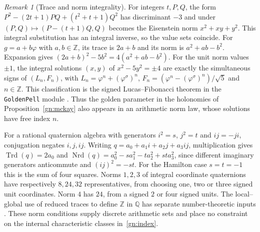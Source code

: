 \documentclass[aps,pra,onecolumn,superscriptaddress,nofootinbib,10pt]{revtex4-2}
\theoremstyle{definition}
\theoremstyle{remark}
\newtheorem{remark}[theorem]{Remark}
\begin{document}
\begin{remark}[Trace and norm integrality]\label{gn:leanarith}
For integers $t,P,Q$, the form
$P^2-(2t+1)PQ+(t^2+t+1)Q^2$ has discriminant $-3$ and
under $(P,Q)\mapsto(P-(t+1)Q,Q)$ becomes the Eisenstein norm
$x^2+xy+y^2$. This integral substitution has an integral
inverse, so the value sets coincide. For $g=a+b\varphi$ with
$a,b\in\mathbb Z$, its trace is $2a+b$ and its norm is
$a^2+ab-b^2$. Expansion gives
$(2a+b)^2-5b^2=4(a^2+ab-b^2)$. For the unit norm values $\pm1$,
the integral solutions $(x,y)$ of $x^2-5y^2=\pm4$ are exactly
the simultaneous signs of $(L_n,F_n)$, with
$L_n=\varphi^n+(\varphi^\sigma)^n$,
$F_n=(\varphi^n-(\varphi^\sigma)^n)/\sqrt5$ and $n\in\mathbb Z$.
This classification is the signed Lucas--Fibonacci theorem in
the \texttt{GoldenPell} module \cite{ub:lean}.
Thus the golden parameter in the holonomies of
Proposition~\ref{gn:mckay} also appears in an arithmetic norm
law, whose solutions have free index $n$.

For a rational quaternion algebra with generators $i^2=s$,
$j^2=t$ and $ij=-ji$, conjugation negates $i,j,ij$.
Writing $q=a_0+a_1i+a_2j+a_3ij$, multiplication gives
$\operatorname{Trd}(q)=2a_0$ and
$\operatorname{Nrd}(q)=a_0^2-sa_1^2-ta_2^2+st a_3^2$,
since different imaginary generators anticommute and
$(ij)^2=-st$. For the Hamilton case $s=t=-1$ this is the
sum of four squares. Norms $1,2,3$ of integral coordinate
quaternions have respectively $8,24,32$ representatives,
from choosing one, two or three signed unit coordinates.
Norm $4$ has $24$, from a signed $2$ or four signed units.
The local--global use of reduced traces to define
$\mathbb Z$ in $\mathbb Q$ has separate number-theoretic
inputs \cite[Theorem~1]{gn:koenigsmann}. These norm conditions
supply discrete arithmetic sets and place no constraint on the
internal characteristic classes in~\eqref{gn:index}.
\end{remark}
\end{document}
